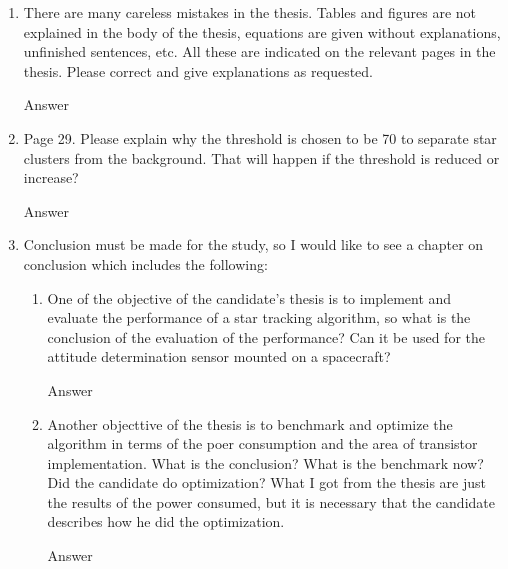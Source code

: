 \documentclass[dvips,a4paper,12pt]{report}
\begin{document}
\begin{enumerate}
    \color{blue}
    \item There are many careless mistakes in the thesis. Tables and figures are not explained in the body of the thesis, equations are given without explanations, unfinished sentences, etc. All these are indicated on the relevant pages in the thesis. Please correct and give explanations as requested.

    \color{black}
    Answer

    \color{blue}
    \item Page 29. Please explain why the threshold is chosen to be 70 to separate star clusters from the background. That will happen if the threshold is reduced or increase?

    \color{black}
    Answer

    \color{blue}
    \item Conclusion must be made for the study, so I would like to see a chapter on conclusion which includes the following:
    \begin{enumerate}[label=(\alph*)]
        \color{blue}
        \item One of the objective of the candidate's thesis is to implement and evaluate the performance of a star tracking algorithm, so what is the conclusion of the evaluation of the performance? Can it be used for the attitude determination sensor mounted on a spacecraft?

        \color{black}
        Answer

        \color{blue}
        \item Another objecttive of the thesis is to benchmark and optimize the algorithm in terms of the poer consumption and the area of transistor implementation. What is the conclusion? What is the benchmark now? Did the candidate do optimization? What I got from the thesis are just the results of the power consumed, but it is necessary that the candidate describes how he did the optimization.

        \color{black}
        Answer
    \end{enumerate}

\end{enumerate}



\end{document}
